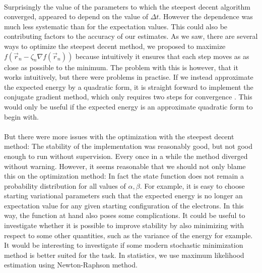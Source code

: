 \documentclass[11pt,english,a4paper]{article}
\begin{document}
\\
Surprisingly the value of the parameters to which the steepest decent algorithm converged, appeared to depend on the value of $\Delta t$. However the dependence was much less systematic than for the expectation values. This could also be contributing factors to the accuracy of our estimates. As we saw, there are several ways to optimize the steepest decent method, we proposed to maximize $f(\vec{r}_{n} - \zeta_{n} \nabla f(\vec{r}_{n}))$ because intuitively it ensures that each step moves as as close as possible to the minimum. The problem with this is however, that it works intuitively, but there were problems in practise. If we instead approximate the expected energy by a quadratic form, it is straight forward to implement the conjugate gradient method, which only requires two steps for convergence \parencite{press_numerical_2007}. This would only be useful if the expected energy is an approximate quadratic form to begin with.
\\
\\
But there were more issues with the optimization with the steepest decent method: The stability of the implementation was reasonably good, but not good enough to run without supervision. Every once in a while the method diverged without warning. However, it seems reasonable that we should not only blame this on the optimization method: In fact the state function does not remain a probability distribution for all values of $\alpha,\beta$. For example, it is easy to choose starting variational parameters such that the expected energy is no longer an expectation value for any given starting configuration of the electrons. In this way, the function at hand also poses some complications. It could be useful to investigate whether it is possible to improve stability by also minimizing with respect to some other quantities, such as the variance of the energy for example. It would be interesting to investigate if some modern stochastic minimization method is better suited for the task. In statistics, we use maximum likelihood estimation using Newton-Raphson method.
\\
\\
\end{document}
